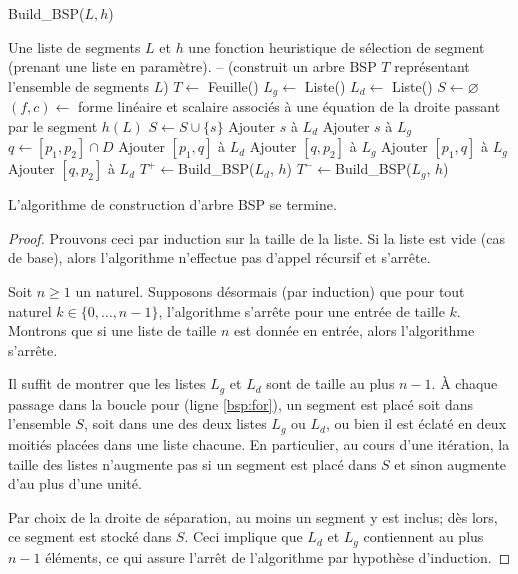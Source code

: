 \begin{algorithm}
  \caption{Build\_BSP($L, h$)}
  \begin{algorithmic}[1] \label{algo:bsp}
    \REQUIRE Une liste de segments $L$ et $h$ une fonction
    heuristique de sélection de segment (prenant une liste en paramètre).
    \ENSURE -- (construit un arbre BSP $T$ représentant
    l'ensemble de segments $L$)
    \STATE $T\leftarrow$ Feuille()
    \STATE $L_g\leftarrow$ Liste()
    \STATE $L_d\leftarrow$ Liste()
    \STATE $S \leftarrow \varnothing$
    \STATE $\left(f, c\right)\leftarrow$ forme linéaire et scalaire
    associés à une équation de la droite passant par le segment $h(L)$
     \label{bsp:for}
    \STATE $S\leftarrow S\cup\{s\}$
    \STATE Ajouter $s$ à $L_d$
    \STATE Ajouter $s$ à $L_g$
    \ELSE
    \STATE $q\leftarrow [p_1, p_2]\cap D$
    \STATE Ajouter $[p_1, q]$ à $L_d$
    \STATE Ajouter $[q, p_2]$ à $L_g$
    \ELSE
    \STATE Ajouter $[p_1, q]$ à $L_g$
    \STATE Ajouter $[q, p_2]$ à $L_d$
    \ENDIF
    \ENDIF
    \ENDFOR
    \STATE $T^+\leftarrow$Build\_BSP($L_d$, $h$)
    \STATE $T^-\leftarrow$Build\_BSP($L_g$, $h$)
    \ENDIF
  \end{algorithmic}
\end{algorithm}

\begin{prop}
  L'algorithme de construction d'arbre BSP se termine.
\end{prop}
\begin{proof}
  Prouvons ceci par induction sur la taille de la liste.
  Si la liste est vide (cas de base), alors l'algorithme n'effectue
  pas d'appel récursif et s'arrête.

  Soit $n\geq 1$ un naturel. Supposons désormais (par induction) que pour
  tout naturel $k\in\{0, \ldots, n-1\}$, l'algorithme s'arrête pour
  une entrée de taille $k$. Montrons que si une liste de taille $n$
  est donnée en entrée, alors l'algorithme s'arrête.

  Il suffit de montrer que les listes $L_g$ et $L_d$ sont de taille
  au plus $n-1$. \`{A} chaque passage dans la boucle pour (ligne \ref{bsp:for}), un segment
  est placé soit dans l'ensemble $S$, soit dans une des deux listes
  $L_g$ ou $L_d$, ou bien il est éclaté en deux moitiés placées
  dans une liste chacune. En particulier, au cours d'une itération,
  la taille des listes n'augmente pas si un segment est placé dans $S$
  et sinon augmente d'au plus d'une unité.

  Par choix de la droite de séparation,
  au moins un segment y est inclus; dès lors, ce segment est stocké
  dans $S$. Ceci implique que $L_d$ et $L_g$ contiennent au plus $n-1$
  éléments, ce qui assure l'arrêt de l'algorithme par hypothèse d'induction.
\end{proof}


